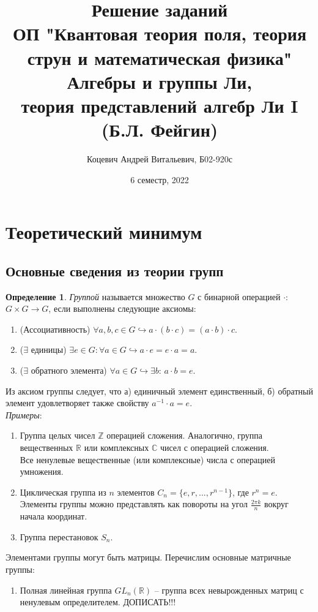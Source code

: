 \documentclass[12pt]{article}
\title{Решение заданий\\ ОП "Квантовая теория поля, теория струн и математическая физика"\\[2cm]
Алгебры и группы Ли,\\ теория представлений алгебр Ли I\\ (Б.Л. Фейгин)}
\author{Коцевич Андрей Витальевич, Б02-920с}
\date{6 семестр, 2022}
\theoremstyle{definition}
\newtheorem{defin}[theorem]{Определение}
\begin{document}
\setlength{\parindent}{0pt}
\maketitle
\newpage
\tableofcontents{}
\newpage
\section{Теоретический минимум}
\subsection{Основные сведения из теории групп}
\begin{defin}
\textit{Группой} называется множество $G$ с бинарной операцией $\cdot$: $G\times G\rightarrow G$, если выполнены следующие аксиомы:
\begin{enumerate}
    \item (Ассоциативность) $\forall a,b,c\in G\hookrightarrow a\cdot(b\cdot c)=(a\cdot b)\cdot c$.
    \item ($\exists$ единицы) $\exists e\in G:\forall a\in G\hookrightarrow a\cdot e=e\cdot a=a$.
    \item ($\exists$ обратного элемента) $\forall a\in G\hookrightarrow\exists b$: $a\cdot b=e$.
\end{enumerate}
\end{defin}
Из аксиом группы следует, что а) единичный элемент единственный, б) обратный элемент удовлетворяет также свойству $a^{-1}\cdot a=e$.\\
\textit{Примеры}:
\begin{enumerate}
    \item Группа целых чисел $\mathbb{Z}$ операцией сложения. Аналогично, группа вещественных $\mathbb{R}$ или комплексных $\mathbb{C}$ чисел с операцией сложения.\\
    Все ненулевые вещественные (или комплексные) числа с операцией умножения.
    \item Циклическая группа из $n$ элементов $C_n=\{e, r, ... , r^{n-1}\}$, где $r^n = e$. Элементы группы можно представлять как повороты на угол $\frac{2\pi k}{n}$ вокруг начала координат.
    \item Группа перестановок $S_n$.
\end{enumerate}
Элементами группы могут быть матрицы. Перечислим основные матричные группы:
\begin{enumerate}
    \item Полная линейная группа $GL_n(\mathbb{R})$ -- группа всех невырожденных матриц с ненулевым определителем.
    ДОПИСАТЬ!!!
\end{enumerate}
\end{document}
